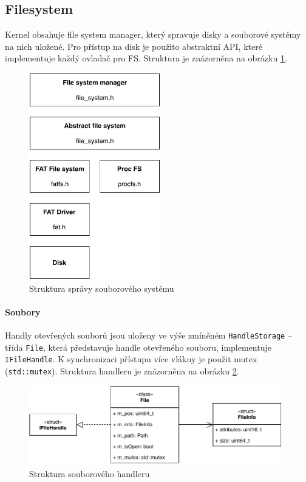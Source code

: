 \documentclass[11pt,a4paper]{scrartcl}
\begin{document}
	
	\subsection{Filesystem}
	
	Kernel obsahuje file system manager, který spravuje disky a souborové systémy na nich uložené. Pro přístup na disk je použito abstraktní API, které implementuje každý ovladač pro FS. Struktura je znázorněna na obrázku \ref{fig:fs-layers}. 
	
	\begin{figure}[H]
		\centering
		\includegraphics[height=9cm]{fs-layers.pdf}
		\caption{Struktura správy souborového systému}
		\label{fig:fs-layers}
	\end{figure}

	\paragraph{Soubory} Handly otevřených souborů jsou uloženy ve výše zmíněném \verb|HandleStorage| -- třída \verb|File|, která představuje handle otevřeného souboru, implementuje \verb|IFileHandle|. K synchronizaci přístupu více vlákny je použit mutex (\verb|std::mutex|). Struktura handleru je znázorněna na obrázku \ref{fig:file-handler}.
	
	\begin{figure}[H]
		\centering
		\includegraphics[width=11cm]{file-handler.pdf}
		\caption{Struktura souborového handleru}
		\label{fig:file-handler}
	\end{figure} 
	
\end{document}
